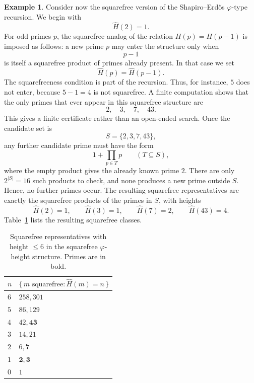 \documentclass[11pt]{article}
\theoremstyle{definition}
\newtheorem{example}{Example}
\begin{document}
\begin{example}\label{eg:sf-phi}
Consider now the squarefree version of the Shapiro--Erd\H{o}s
\(\varphi\)-type recursion.  We begin with
\[
  \widehat H(2)=1.
\]
For odd primes \(p\), the squarefree analog of the relation
\(H(p)=H(p-1)\) is imposed as follows: a new prime \(p\) may enter the
structure only when
\[
  p-1
\]
is itself a squarefree product of primes already present.  In that case we set
\[
  \widehat H(p)=\widehat H(p-1).
\]
The squarefreeness condition is part of the recursion.  Thus, for instance,
\(5\) does not enter, because \(5-1=4\) is not squarefree.
A finite computation shows that the only primes that ever appear in this
squarefree structure are
\[
  2,\quad 3,\quad 7,\quad 43.
\]
This gives a finite certificate rather than an open-ended search.  Once the
candidate set is
\[
  S=\{2,3,7,43\},
\]
any further candidate prime must have the form
\[
  1+\prod_{p\in T}p
  \qquad(T\subseteq S),
\]
where the empty product gives the already known prime \(2\).  There are only
\(2^{|S|}=16\) such products to check, and none produces a new prime outside
\(S\).  Hence, no further primes occur.
The resulting squarefree representatives are exactly the squarefree products of
the primes in \(S\), with heights
\[
  \widehat H(2)=1,\qquad
  \widehat H(3)=1,\qquad
  \widehat H(7)=2,\qquad
  \widehat H(43)=4.
\]
Table~\ref{tab:sf-phi} lists the resulting squarefree classes.
\begin{table}[ht]
\centering
\begin{tabular}{|l|l|}
\hline\hline
\(n\) & \(\{\,m\text{ squarefree}:\widehat H(m)=n\,\}\)\\
\hline
\(6\) & \(258, 301\) \\
\(5\) & \(86, 129\) \\
\(4\) & \(42, \mathbf{43}\) \\
\(3\) & \(14, 21\) \\
\(2\) & \(6, \mathbf{7}\) \\
\(1\) & \(\mathbf{2}, \mathbf{3}\) \\
\(0\) & \(1\) \\
\hline
\end{tabular}
\caption{Squarefree representatives with height \(\le6\) in the squarefree
\(\varphi\)-height structure.  Primes are in bold.}
\label{tab:sf-phi}
\end{table}
\end{example}
\end{document}
